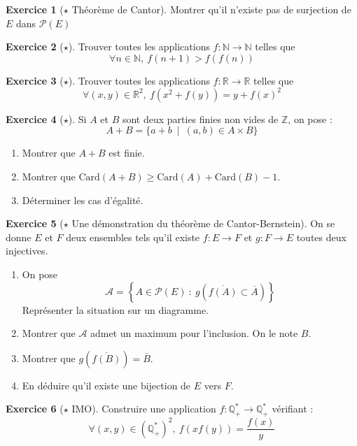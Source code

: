 \documentclass[french]{book}
\newcommand{\N}{\mathbb{N}}
\newcommand{\Z}{\mathbb{Z}}
\newcommand{\Q}{\mathbb{Q}}
\newcommand{\R}{\mathbb{R}}
\newcommand{\st}{^*}
\newcommand{\card}{\text{Card}}
\theoremstyle{definition}
\newtheorem{ex}{Exercice}[chapter]
\theoremstyle{theorem}
\theoremstyle{remark}
\begin{document}
\begin{ex}[$\star$ Théorème de Cantor]
	Montrer qu'il n'existe pas de surjection de $E$ dans $\mathcal{P}(E)$
\end{ex}

\begin{ex}[$\star$]
	Trouver toutes les applications $f:\N\to\N$ telles que $$\forall n\in\N,\ f(n+1)>f(f(n))$$
\end{ex}

\begin{ex}[$\star$]
	Trouver toutes les applications $f:\R\to\R$ telles que $$\forall (x,y)\in\R^2,\ f(x^2+f(y))=y+f(x)^2$$
\end{ex}

\begin{ex}[$\star$]
	Si $A$ et $B$ sont deux parties finies non vides de $\Z$, on pose : $$A+B=\{a+b\ \mid \ (a,b)\in A\times B\}$$
	\begin{enumerate}
		\item Montrer que $A+B$ est finie.
		\item Montrer que $\card(A+B)\geqslant\card(A)+\card(B)-1$.
		\item Déterminer les cas d'égalité.
	\end{enumerate}
\end{ex}

\begin{ex}[$\star$ Une démonstration du théorème de Cantor-Bernstein]
	On se donne $E$ et $F$ deux ensembles tels qu'il existe $f:E\to F$ et $g:F\to E$ toutes deux injectives.
	\begin{enumerate}
		\item On pose $$\mathcal{A}=\left\{A\in\mathcal{P}(E)\ : \ g\left(\overline{f(A)}\subset\overline{A}\right)\right\}$$
		Représenter la situation sur un diagramme.
		\item Montrer que $\mathcal{A}$ admet un maximum pour l'inclusion. On le note $B$.
		\item Montrer que $g\displaystyle\left(\overline{f(B)}\right)=\overline{B}$.
		\item En déduire qu'il existe une bijection de $E$ vers $F$.
	\end{enumerate}
\end{ex}

\begin{ex}[$\star$ IMO]
	Construire une application $f:\Q_+\st\to\Q_+\st$ vérifiant : $$\forall (x,y)\in(\Q_+\st)^2,\ f(xf(y))=\frac{f(x)}{y}$$
\end{ex}
\end{document}
